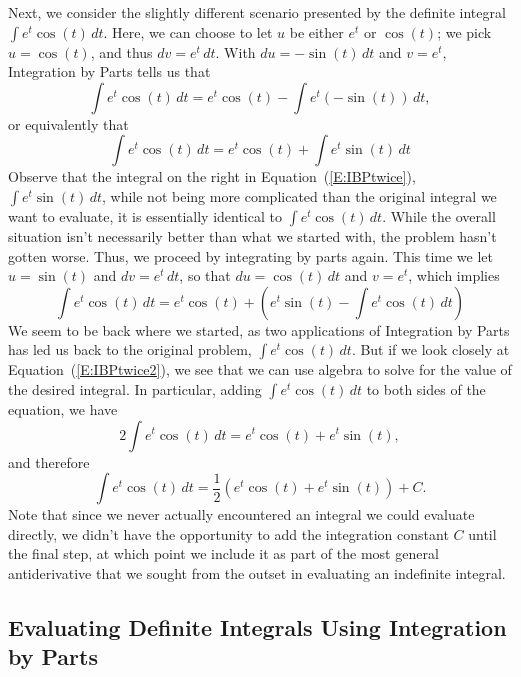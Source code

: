 Next, we consider the slightly different scenario presented by the definite integral $\int e^t \cos(t) \, dt$.  Here, we can choose to let $u$ be either $e^t$ or $\cos(t)$; we pick $u = \cos(t)$, and thus $dv = e^t \, dt$.  With $du = -\sin(t) \, dt$ and $v = e^t$, Integration by Parts tells us that
$$\int e^t \cos(t) \, dt = e^t \cos(t) - \int e^t (-\sin(t))\, dt,$$
or equivalently that
\begin{equation} \label{E:IBPtwice}
\int e^t \cos(t) \, dt = e^t \cos(t) + \int e^t \sin(t) \, dt
\end{equation}
Observe that the integral on the right in Equation~(\ref{E:IBPtwice}), $\int e^t \sin(t) \, dt$, while not being more complicated than the original integral we want to evaluate, it is essentially identical to $\int e^t \cos(t) \, dt$.  While the overall situation isn't necessarily better than what we started with, the problem hasn't gotten worse.  Thus, we proceed by integrating by parts again.  This time we let $u = \sin(t)$ and $dv = e^t \, dt$, so that $du = \cos(t) \, dt$ and $v = e^t$, which implies
\begin{equation} \label{E:IBPtwice2}
\int e^t \cos(t) \, dt = e^t \cos(t) + \left( e^t \sin(t) - \int e^t \cos(t) \, dt \right)
\end{equation}
We seem to be back where we started, as two applications of Integration by Parts has led us back to the original problem, $\int e^t \cos(t) \, dt$.  But if we look closely at Equation~(\ref{E:IBPtwice2}), we see that we can use algebra to solve for the value of the desired integral.  In particular, adding $\int e^t \cos(t) \, dt$ to both sides of the equation, we have 
$$2 \int e^t \cos(t) \, dt = e^t \cos(t) +  e^t \sin(t),$$
and therefore 
$$ \int e^t \cos(t) \, dt = \frac{1}{2} \left( e^t \cos(t) +  e^t \sin(t) \right) + C.$$
Note that since we never actually encountered an integral we could evaluate directly, we didn't have the opportunity to add the integration constant $C$ until the final step, at which point we include it as part of the most general antiderivative that we sought from the outset in evaluating an indefinite integral.



\subsection*{Evaluating Definite Integrals Using Integration by Parts} 

